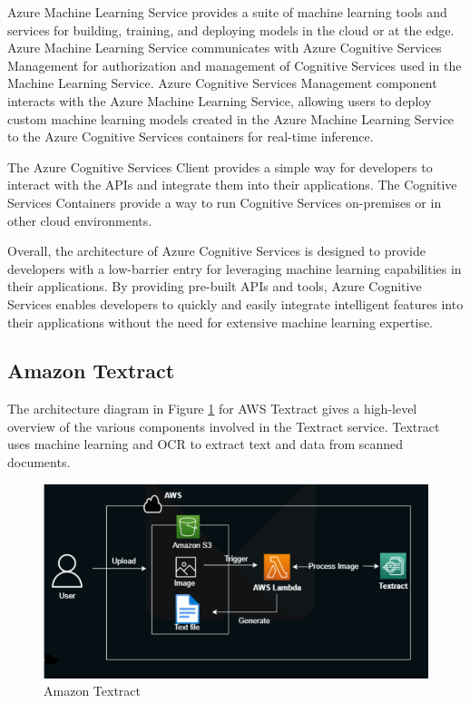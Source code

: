 Azure Machine Learning Service provides a suite of machine learning tools and services for building, training, and deploying models in the cloud or at the edge. Azure Machine Learning Service communicates with Azure Cognitive Services Management for authorization and management of Cognitive Services used in the Machine Learning Service. Azure Cognitive Services Management component interacts with the Azure Machine Learning Service, allowing users to deploy custom machine learning models created in the Azure Machine Learning Service to the Azure Cognitive Services containers for real-time inference.

The Azure Cognitive Services Client provides a simple way for developers to interact with the \acs{API}s and integrate them into their applications. The Cognitive Services Containers provide a way to run Cognitive Services on-premises or in other cloud environments.

Overall, the architecture of Azure Cognitive Services is designed to provide developers with a low-barrier entry for leveraging machine learning capabilities in their applications. By providing pre-built \acs{API}s and tools, Azure Cognitive Services enables developers to quickly and easily integrate intelligent features into their applications without the need for extensive machine learning expertise.


\subsection{Amazon Textract}

The architecture diagram in Figure \ref{Amazon_arch} \cite{amazonTextractArch} for \acs{AWS} Textract gives a high-level overview of the various components involved in the Textract service. Textract uses machine learning and \ac{OCR} to extract text and data from scanned documents.

\begin {figure}[ht]
\centering
\includegraphics[scale=0.8]{images/Chapter2/Amazon_arch.png}
\caption{Amazon Textract}
\label{Amazon_arch}
\end {figure}

